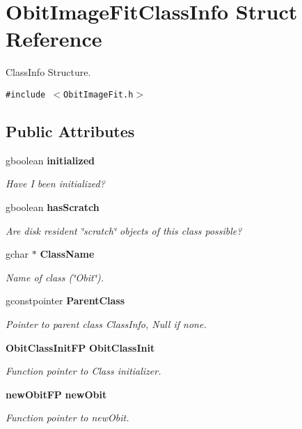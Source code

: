\section{Obit\-Image\-Fit\-Class\-Info Struct Reference}
\label{structObitImageFitClassInfo}
Class\-Info Structure.  


{\tt \#include $<$Obit\-Image\-Fit.h$>$}

\subsection*{Public Attributes}
\begin{CompactItemize}
\item 
gboolean {\bf initialized}
\begin{CompactList}\small\item\em Have I been initialized? \item\end{CompactList}\item 
gboolean {\bf has\-Scratch}
\begin{CompactList}\small\item\em Are disk resident \char`\"{}scratch\char`\"{} objects of this class possible? \item\end{CompactList}\item 
gchar $\ast$ {\bf Class\-Name}
\begin{CompactList}\small\item\em Name of class (\char`\"{}Obit\char`\"{}). \item\end{CompactList}\item 
gconstpointer {\bf Parent\-Class}
\begin{CompactList}\small\item\em Pointer to parent class Class\-Info, Null if none. \item\end{CompactList}\item 
{\bf Obit\-Class\-Init\-FP} {\bf Obit\-Class\-Init}
\begin{CompactList}\small\item\em Function pointer to Class initializer. \item\end{CompactList}\item 
{\bf new\-Obit\-FP} {\bf new\-Obit}
\begin{CompactList}\small\item\em Function pointer to new\-Obit. \item\end{CompactList}\item 

\end{CompactItemize}
